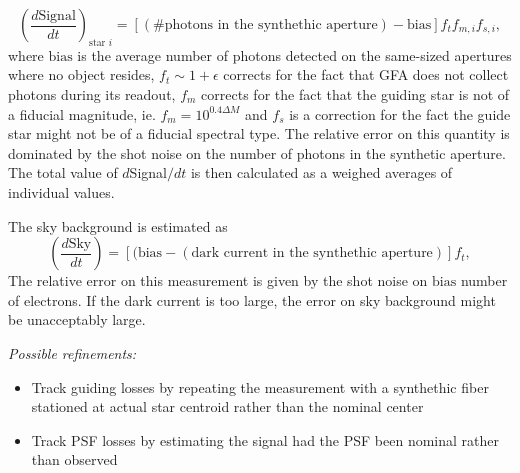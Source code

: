 \documentclass{article}
\begin{document}
\begin{equation}
  \left(\frac{d\mbox{Signal}}{dt}\right)_{\mbox{star\ } i} =
  \left[(\mbox {\#  photons in the synthethic aperture}) -
    \mbox{bias}\right] f_t f_{m,i} f_{s,i},
\end{equation}
where $\mbox{bias}$ is the average number of photons detected on the
same-sized apertures where no object resides, $f_t\sim 1+\epsilon$
corrects for the fact that GFA does not collect photons during its
readout, $f_m$ corrects for the fact that the guiding star is not
of a fiducial magnitude, ie. $f_m=10^{0.4\Delta M}$ and $f_s$ is a
correction for the fact the guide star might not be of a fiducial
spectral type. The relative error on this quantity is dominated by the shot
noise on the number of photons in the synthetic aperture. 
The total value of $d$Signal$/dt$ is then calculated as a weighed
averages of individual values.

The sky background is estimated as
\begin{equation}
  \left(\frac{d\mbox{Sky}}{dt}\right) =
  \left[(\mbox{bias}-(\mbox{dark current in the synthethic aperture})\right] f_t,
\end{equation}
The relative error on this measurement is given by the shot noise on
$\mbox{bias}$ number of electrons. If the dark current is too large,
the error on sky background might be unacceptably large.


\newcommand{\pr}{\textit{Possible refinements:}}

\pr
\begin{itemize}
\item Track guiding losses by repeating the measurement with a synthethic
  fiber stationed at actual star centroid rather than the nominal
  center
\item Track PSF losses by estimating the signal had the PSF been
  nominal rather than observed
\end{itemize}
\end{document}
